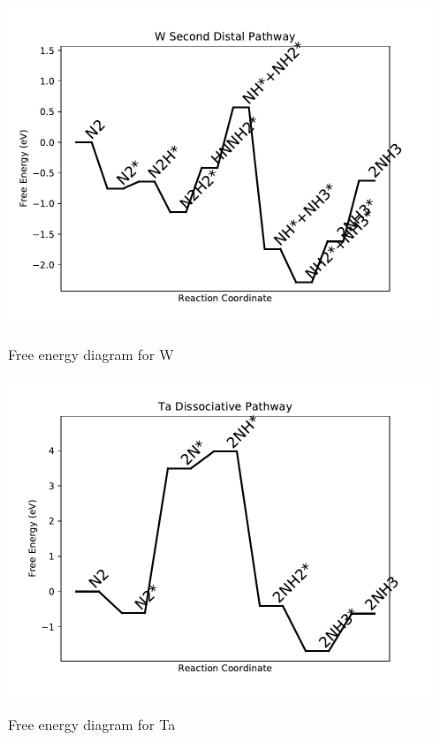\documentclass[journal=jacsat,manuscript=article]{achemso}
\begin{document}
\begin{figure}
\includegraphics[width=1\linewidth]{data/plots/W_distal_2.pdf}
\label{fig:W_distal_2}
\caption{Free energy diagram for W}
\end{figure}

\newpage
\begin{figure}
\includegraphics[width=1\linewidth]{data/plots/Ta_dissociative.pdf}
\label{fig:Ta_dissociative}
\caption{Free energy diagram for Ta}
\end{figure}
\end{document}
